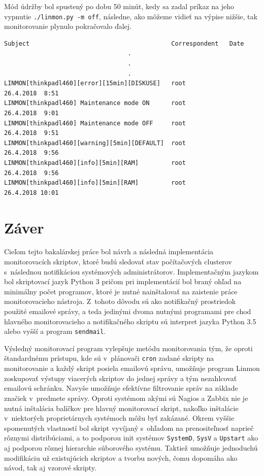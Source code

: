 Mód údržby bol spustený po dobu 50 minút, kedy sa zadal príkaz na jeho vypnutie \texttt{./linmon.py -m off}, následne, ako môžeme vidieť na výpise nižšie, tak monitorovanie plynulo pokračovalo ďalej.

\begin{verbatim}
Subject                                       Correspondent   Date
                                  .
                                  .
                                  .
LINMON[thinkpadl460][error][15min][DISKUSE]   root            26.4.2018  8:51
LINMON[thinkpadl460] Maintenance mode ON      root            26.4.2018  9:01
LINMON[thinkpadl460] Maintenance mode OFF     root            26.4.2018  9:51
LINMON[thinkpadl460][warning][5min][DEFAULT]  root            26.4.2018  9:56
LINMON[thinkpadl460][info][5min][RAM]         root            26.4.2018  9:56
LINMON[thinkpadl460][info][5min][RAM]         root            26.4.2018 10:01
\end{verbatim}

\chapter{Záver}
Cieľom tejto bakalárskej práce bol návrh a následná implementácia monitorovacích skriptov, ktoré budú sledovať stav počítačových clusterov s~následnou notifikáciou systémových administrátorov. Implementačným jazykom bol skriptovací jazyk Python 3 pričom pri implementácií bol braný ohľad na minimálny počet programov, ktoré je nutné nainštalovať na zaistenie práce monitorovacieho nástroja. Z~tohoto dôvodu sú ako notifikačný prostriedok použité emailové správy, a teda jedinými dvoma nutnými programami pre chod hlavného monitorovacieho a notifikačného skriptu sú interpret jazyka Python 3.5 alebo vyšší a program \texttt{sendmail}.

Výsledný monitorovací program vylepšuje metódu monitorovania tým, že oproti štandardnému prístupu, kde sú v~plánovači \texttt{cron} zadané skripty na monitorovanie a každý skript posiela emailovú správu, umožňuje program Linmon zoskupovať výstupy viacerých skriptov do jednej správy a tým nezahlcovať emailovú schránku. Navyše umožňuje efektívne filtrovanie správ na základe značiek v~predmete správy. Oproti systémom akými sú Nagios a Zabbix nie je nutná inštalácia balíčkov pre hlavný monitorovací skript, nakoľko inštalácie v~niektorých proprietárnych systémoch môžu byť zakázané. Okrem vyššie spomenutých vlastností bol skript vyvíjaný s~ohľadom na prenositeľnosť naprieč rôznymi distribúciami, a to podporou init systémov \texttt{SystemD}, \texttt{SysV} a \texttt{Upstart} ako aj podporou rôznej hierarchie súborového systému. Taktiež umožňuje jednoduchú modifikáciu už existujúcich skriptov a tvorbu nových, čomu dopomáha ako návod, tak aj vzorové skripty.

